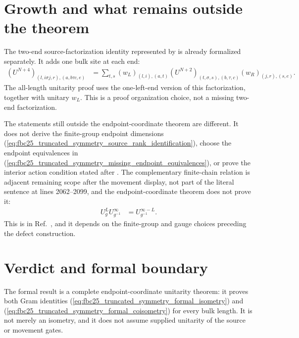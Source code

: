 \documentclass{article}
\begin{document}
\section{Growth and what remains outside the theorem}

The two-end source-factorization identity represented by
 is already formalized separately. It
adds one bulk site at each end:
\begin{align}
    (U^{N+4})_{(l,i\sigma j,r),(a,b\tau c,e)}
     & =
    \sum_{t,s}
    (w_L)_{(l,i),(a,t)}
    (U^{N+2})_{(t,\sigma,s),(b,\tau,c)}
    (w_R)_{(j,r),(s,e)}.
    \label{eq:fbc25_truncated_symmetry_two_end_growth}
\end{align}
The all-length unitarity proof uses the one-left-end version of this
factorization, together with unitary \(w_L\). This is a proof organization
choice, not a missing two-end factorization.

The statements still outside the endpoint-coordinate theorem are different.
It does not derive the finite-group endpoint dimensions
(\ref{eq:fbc25_truncated_symmetry_source_rank_identification}), choose the
endpoint equivalences in
(\ref{eq:fbc25_truncated_symmetry_missing_endpoint_equivalences}), or prove the
interior action condition stated after . The
complementary finite-chain relation is adjacent remaining scope after the
movement display, not part of the literal sentence at lines 2062--2099, and
the endpoint-coordinate theorem does not prove it:
\begin{align}
    U_g^L U_{g^{-1}}^\infty & = U_{g^{-1}}^{\infty-L}.
    \label{eq:fbc25_truncated_symmetry_complementary_relation}
\end{align}
This is  in
Ref.~\cite[lines~2176--2181]{FrancoRubio2025MPUGauging}, and it depends on the
finite-group and gauge choices preceding the defect construction.

\section{Verdict and formal boundary}

The formal result is a complete endpoint-coordinate unitarity theorem: it
proves both Gram identities
(\ref{eq:fbc25_truncated_symmetry_formal_isometry}) and
(\ref{eq:fbc25_truncated_symmetry_formal_coisometry}) for every bulk length.
It is not merely an isometry, and it does not assume supplied unitarity of
the source or movement gates.
\end{document}

